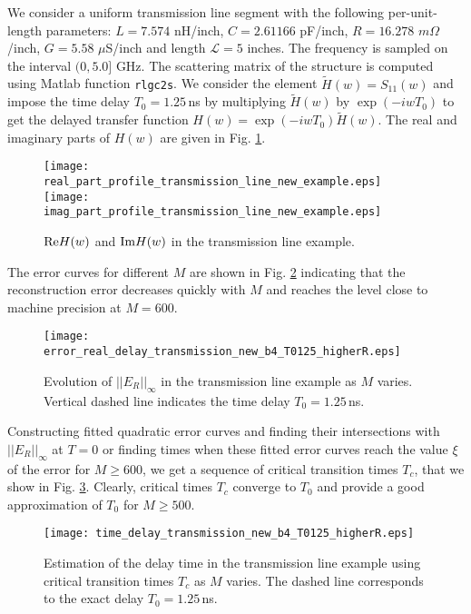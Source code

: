 \documentclass[journal,twoside]{IEEEtran}
\begin{document}
We consider a uniform transmission line segment with the following per-unit-length parameters: $L=7.574$ nH/inch, $C=2.61166$ pF/inch, $R=16.278$ $m\Omega$/inch, $G=5.58$  $\mu$S/inch and length ${\mathcal L}=5$ inches. 
The frequency is sampled on the interval $(0, 5.0]$ GHz.
The scattering matrix of the structure is computed using Matlab function {\tt rlgc2s}. We consider the element $\tilde H(w)=S_{11}(w)$ and 
impose the time delay $T_0=1.25$\,ns  by multiplying $\tilde H(w)$ by  $\exp(-iwT_0)$ to get the delayed transfer function $H(w)=\exp(-iwT_0)\tilde H(w)$. The real and imaginary parts of $H(w)$ are given in Fig. \ref{Ftransm_line_new0}. 
\begin{figure}[h] \begin{center}
\texttt{[image: real\_part\_profile\_transmission\_line\_new\_example.eps]}
\hspace{10pt}
\texttt{[image: imag\_part\_profile\_transmission\_line\_new\_example.eps]}
\end{center}
\caption{${\mathop{\rm Re}\nolimits} H(w)$ and ${\mathop{\rm Im}\nolimits} H(w)$ in the transmission line example.} 
\label{Ftransm_line_new0}
\end{figure}
The error curves for different $M$ are shown in Fig. \ref{Ftransm_line_new1} indicating that the reconstruction error decreases quickly with $M$ and reaches the level close to machine precision at $M=600$.
\begin{figure}[h] \begin{center}
\texttt{[image: error\_real\_delay\_transmission\_new\_b4\_T0125\_higherR.eps]}
\end{center}
\caption{Evolution of $||E_R||_\infty$ in the transmission line example as $M$ varies. Vertical dashed line indicates the time delay $T_0=1.25$\,ns.}
\label{Ftransm_line_new1}
\end{figure}
Constructing fitted quadratic error curves and finding their intersections with $||E_R||_\infty$ at $T=0$ or finding times when these fitted error curves reach the value $\xi$ of the error for $M\geq 600$, we get a sequence of critical transition times $T_c$, that we show in Fig. \ref{Ftransm_line_new2}. Clearly, critical times $T_c$ converge to $T_0$ and provide a good approximation of $T_0$ for $M\geq 500$.
\begin{figure}[h] \begin{center}
\texttt{[image: time\_delay\_transmission\_new\_b4\_T0125\_higherR.eps]}
\end{center}
\caption{Estimation of the delay time in the transmission line example using critical transition times $T_c$ as $M$ varies. The dashed line corresponds to the exact delay $T_0=1.25$\,ns.} 
\label{Ftransm_line_new2}
\end{figure}
\end{document}
